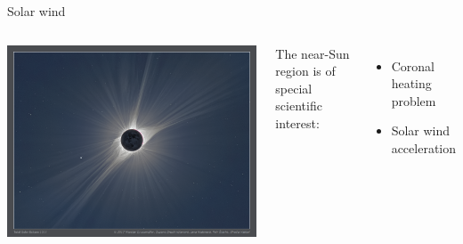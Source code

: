 \begin{frame}[plain,c]{Solar wind}{}
	\begin{columns}[c]
		
		\hspace*{-17pt}
		\includegraphics[width=\textwidth]{../talk_figures/TSE_2017_200mm_Whiskey_m-d.png}
		
		
		The near-Sun region is of special scientific interest:\\
		\begin{itemize}
			\item Coronal heating problem
			\item Solar wind acceleration
		\end{itemize}
		
	\end{columns}
\end{frame}

